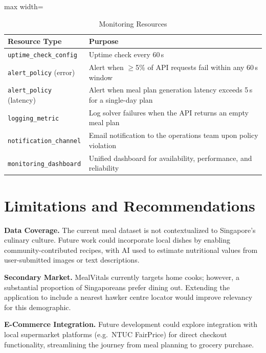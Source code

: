 \documentclass[conference]{IEEEtran}
\begin{document}
\begin{table}[H]
\caption{Monitoring Resources}
\label{tab:monitoring}
\begin{center}
\begin{adjustbox}{max width=\columnwidth}
\begin{tabular}{p{4.2cm}p{4cm}}
\toprule
\textbf{Resource Type} & \textbf{Purpose} \\
\midrule
\texttt{uptime\_check\_config} & Uptime check every 60\,s \\
\texttt{alert\_policy} (error) & Alert when $\geq$5\% of API requests fail within any 60\,s window \\
\texttt{alert\_policy} (latency) & Alert when meal plan generation latency exceeds 5\,s for a single-day plan \\
\texttt{logging\_metric} & Log solver failures when the API returns an empty meal plan \\
\texttt{notification\_channel} & Email notification to the operations team upon policy violation \\
\texttt{monitoring\_dashboard} & Unified dashboard for availability, performance, and reliability \\
\bottomrule
\end{tabular}
\end{adjustbox}
\end{center}
\end{table}

\section{Limitations and Recommendations}

\textbf{Data Coverage.} The current meal dataset is not contextualized to Singapore's culinary culture. Future work could incorporate local dishes by enabling community-contributed recipes, with AI used to estimate nutritional values from user-submitted images or text descriptions.

\textbf{Secondary Market.} MealVitals currently targets home cooks; however, a substantial proportion of Singaporeans prefer dining out. Extending the application to include a nearest hawker centre locator would improve relevancy for this demographic.

\textbf{E-Commerce Integration.} Future development could explore integration with local supermarket platforms (e.g.\ NTUC FairPrice) for direct checkout functionality, streamlining the journey from meal planning to grocery purchase.
\end{document}
